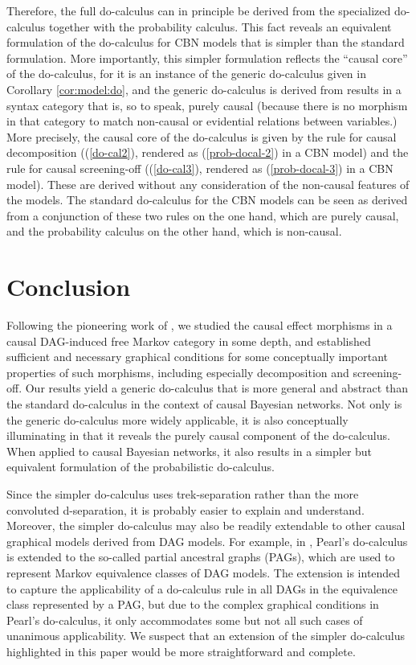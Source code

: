 \documentclass[12pt]{amsart}
\theoremstyle{plain}
\theoremstyle{definition}
\theoremstyle{remark}
\numberwithin{equation}{section}
\theoremstyle{plain}
\newcommand{\0}{\emptyset}
\begin{document}
Therefore, the full do-calculus can in principle be derived from the specialized do-calculus together with the probability calculus. This fact reveals an equivalent formulation of the do-calculus for CBN models that is simpler than the standard formulation. More importantly, this simpler formulation reflects the ``causal core'' of the do-calculus, for it is an instance of the generic do-calculus given in Corollary \ref{cor:model:do}, and the generic do-calculus is derived from results in a syntax category that is, so to speak, purely causal (because there is no morphism in that category to match non-causal or evidential relations between variables.) More precisely, the causal core of the do-calculus is given by the rule for causal decomposition ((\ref{do-cal2}), rendered as (\ref{prob-docal-2}) in a CBN model) and the rule for causal screening-off ((\ref{do-cal3}), rendered as (\ref{prob-docal-3}) in a CBN model). These are derived without any consideration of the non-causal features of the models. The standard do-calculus for the CBN models can be seen as derived from a conjunction of these two rules on the one hand, which are purely causal, and the probability calculus on the other hand, which is non-causal.

\section{Conclusion}
\label{sec:con}
Following the pioneering work of \cite{Fong:thesis}, we studied the causal effect morphisms in a causal DAG-induced free Markov category in some depth, and established sufficient and necessary graphical conditions for some conceptually important properties of such morphisms, including especially decomposition and screening-off. Our results yield a generic do-calculus that is more general and abstract than the standard do-calculus in the context of causal Bayesian networks. Not only is the generic do-calculus more widely applicable, it is also conceptually illuminating in that it reveals the purely causal component of the do-calculus. When applied to causal Bayesian networks, it also results in a simpler but equivalent formulation of the probabilistic do-calculus.

Since the simpler do-calculus uses trek-separation rather than the more convoluted d-separation, it is probably easier to explain and understand.  Moreover, the simpler do-calculus may also be readily extendable to other causal graphical models derived from DAG models. For example,  in \cite{Zhang2008}, Pearl's do-calculus is extended to the so-called partial ancestral graphs (PAGs), which are used to represent Markov equivalence classes of DAG models.  The extension is intended to capture the applicability of a do-calculus rule in all DAGs in the equivalence class represented by a PAG, but due to the complex graphical conditions in Pearl's do-calculus,  it only accommodates some but not all such cases of unanimous applicability.  We suspect that an extension of the simpler do-calculus highlighted in this paper would be more straightforward and complete.
\end{document}
